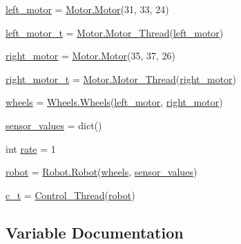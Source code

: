 \begin{DoxyCompactItemize}
\item 
\mbox{\hyperlink{namespacecontroller_accafb331d0342effadbbe3609c156598}{left\+\_\+motor}} = \mbox{\hyperlink{class_motor_1_1_motor}{Motor.\+Motor}}(31, 33, 24)
\item 
\mbox{\hyperlink{namespacecontroller_a6d0f4d0ae0b1cc7e69b7094cec5d44e9}{left\+\_\+motor\+\_\+t}} = \mbox{\hyperlink{class_motor_1_1_motor___thread}{Motor.\+Motor\+\_\+\+Thread}}(\mbox{\hyperlink{namespacecontroller_accafb331d0342effadbbe3609c156598}{left\+\_\+motor}})
\item 
\mbox{\hyperlink{namespacecontroller_a01c7aa0aed71e493785716166c882f4f}{right\+\_\+motor}} = \mbox{\hyperlink{class_motor_1_1_motor}{Motor.\+Motor}}(35, 37, 26)
\item 
\mbox{\hyperlink{namespacecontroller_a6256e3281526776faed48e0dbfb596ec}{right\+\_\+motor\+\_\+t}} = \mbox{\hyperlink{class_motor_1_1_motor___thread}{Motor.\+Motor\+\_\+\+Thread}}(\mbox{\hyperlink{namespacecontroller_a01c7aa0aed71e493785716166c882f4f}{right\+\_\+motor}})
\item 
\mbox{\hyperlink{namespacecontroller_ac1696e3b9bdd35da786bc99515eee2b9}{wheels}} = \mbox{\hyperlink{class_wheels_1_1_wheels}{Wheels.\+Wheels}}(\mbox{\hyperlink{namespacecontroller_accafb331d0342effadbbe3609c156598}{left\+\_\+motor}}, \mbox{\hyperlink{namespacecontroller_a01c7aa0aed71e493785716166c882f4f}{right\+\_\+motor}})
\item 
\mbox{\hyperlink{namespacecontroller_a189bd3b1eaf031673385cc627be55bee}{sensor\+\_\+values}} = dict()
\item 
int \mbox{\hyperlink{namespacecontroller_a0875b114513cfcd900f5969aa48e9e91}{rate}} = 1
\item 
\mbox{\hyperlink{namespacecontroller_a16bd60420374c0595e623e0f1706972a}{robot}} = \mbox{\hyperlink{class_robot_1_1_robot}{Robot.\+Robot}}(\mbox{\hyperlink{namespacecontroller_ac1696e3b9bdd35da786bc99515eee2b9}{wheels}}, \mbox{\hyperlink{namespacecontroller_a189bd3b1eaf031673385cc627be55bee}{sensor\+\_\+values}})
\item 
\mbox{\hyperlink{namespacecontroller_a2445f7bc86ae8711053f9fe3bd4db5a9}{c\+\_\+t}} = \mbox{\hyperlink{classcontroller_1_1_control___thread}{Control\+\_\+\+Thread}}(\mbox{\hyperlink{namespacecontroller_a16bd60420374c0595e623e0f1706972a}{robot}})
\end{DoxyCompactItemize}


\subsection{Variable Documentation}
\mbox{\label{namespacecontroller_a2445f7bc86ae8711053f9fe3bd4db5a9}} 
